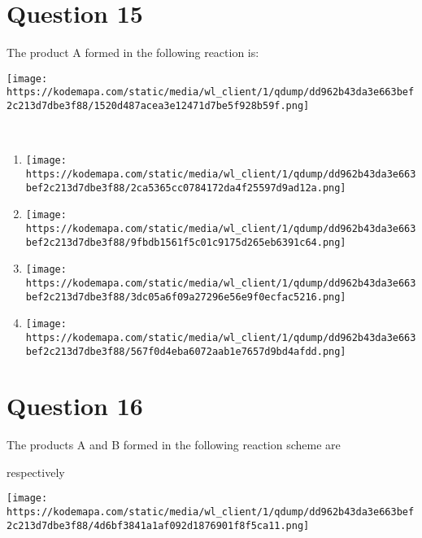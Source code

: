 \documentclass{article}
\begin{document}
\section*{Question 15}
The product A formed in the following reaction is:



\texttt{[image: https://kodemapa.com/static/media/wl\_client/1/qdump/dd962b43da3e663bef2c213d7dbe3f88/1520d487acea3e12471d7be5f928b59f.png]}\\



{}\strut \\


\begin{enumerate}[label=(\alph*)]
\item \texttt{[image: https://kodemapa.com/static/media/wl\_client/1/qdump/dd962b43da3e663bef2c213d7dbe3f88/2ca5365cc0784172da4f25597d9ad12a.png]}


\item \texttt{[image: https://kodemapa.com/static/media/wl\_client/1/qdump/dd962b43da3e663bef2c213d7dbe3f88/9fbdb1561f5c01c9175d265eb6391c64.png]}


\item \texttt{[image: https://kodemapa.com/static/media/wl\_client/1/qdump/dd962b43da3e663bef2c213d7dbe3f88/3dc05a6f09a27296e56e9f0ecfac5216.png]}


\item \texttt{[image: https://kodemapa.com/static/media/wl\_client/1/qdump/dd962b43da3e663bef2c213d7dbe3f88/567f0d4eba6072aab1e7657d9bd4afdd.png]}


\end{enumerate}
\newpage
\section*{Question 16}
The products A and B formed in the following reaction scheme are

respectively



\texttt{[image: https://kodemapa.com/static/media/wl\_client/1/qdump/dd962b43da3e663bef2c213d7dbe3f88/4d6bf3841a1af092d1876901f8f5ca11.png]}\\



{}\strut \\
\end{document}

